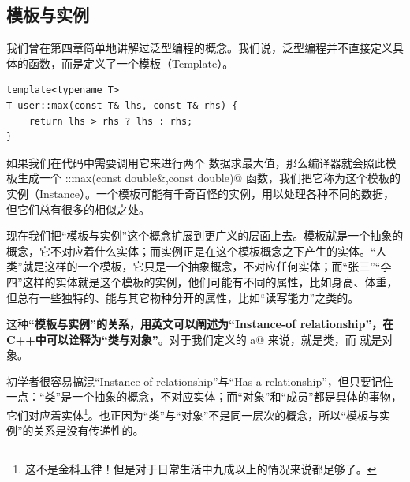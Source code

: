 \subsection*{模板与实例}
我们曾在第四章简单地讲解过泛型编程的概念。我们说，泛型编程并不直接定义具体的函数，而是定义了一个模板（Template）。
\begin{lstlisting}
template<typename T>
T user::max(const T& lhs, const T& rhs) {
    return lhs > rhs ? lhs : rhs;
}
\end{lstlisting}
如果我们在代码中需要调用它来进行两个 \lstinline@double@ 数据求最大值，那么编译器就会照此模板生成一个 \lstinline@user::max(const double&,const double)@ 函数，我们把它称为这个模板的实例（Instance）。一个模板可能有千奇百怪的实例，用以处理各种不同的数据，但它们总有很多的相似之处。\par
现在我们把``模板与实例''这个概念扩展到更广义的层面上去。模板就是一个抽象的概念，它不对应着什么实体；而实例正是在这个模板概念之下产生的实体。``人类''就是这样的一个模板，它只是一个抽象概念，不对应任何实体；而``张三''``李四''这样的实体就是这个模板的实例，他们可能有不同的属性，比如身高、体重，但总有一些独特的、能与其它物种分开的属性，比如``读写能力''之类的。\par
这种\textbf{``模板与实例''的关系，用英文可以阐述为``Instance-of relationship''，在C++中可以诠释为``类与对象''}。对于我们定义的 \lstinline@valarri a@ 来说，\lstinline@valarri@ 就是类，而 \lstinline@a@ 就是对象。\par
初学者很容易搞混``Instance-of relationship''与``Has-a relationship''，但只要记住一点：``类''是一个抽象的概念，不对应实体；而``对象''和``成员''都是具体的事物，它们对应着实体\footnote{这不是金科玉律！但是对于日常生活中九成以上的情况来说都足够了。}。也正因为``类''与``对象''不是同一层次的概念，所以``模板与实例''的关系是没有传递性的。\par
